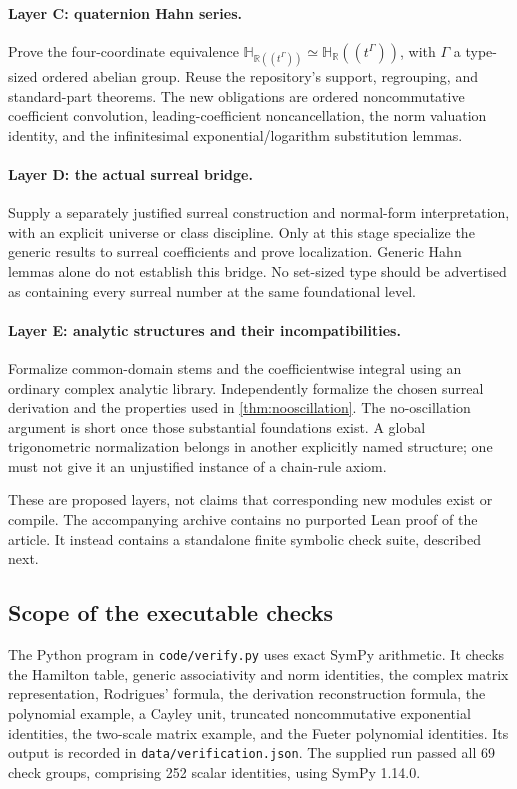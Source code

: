 \documentclass[11pt,letterpaper]{article}
\numberwithin{equation}{section}
\theoremstyle{definition}
\theoremstyle{remark}
\newcommand{\HR}{\mathbb H_{\mathbb R}}
\newcommand{\R}{\mathbb R}
\begin{document}
\paragraph{Layer C: quaternion Hahn series.}
Prove the four-coordinate equivalence
$\mathbb H_{\R((t^\Gamma))}\simeq\HR((t^\Gamma))$, with $\Gamma$ a type-sized ordered
abelian group. Reuse the repository's support, regrouping, and standard-part theorems.
The new obligations are ordered noncommutative coefficient convolution, leading-coefficient
noncancellation, the norm valuation identity, and the infinitesimal exponential/logarithm
substitution lemmas.

\paragraph{Layer D: the actual surreal bridge.}
Supply a separately justified surreal construction and normal-form interpretation, with an
explicit universe or class discipline. Only at this stage specialize the generic results to
surreal coefficients and prove localization. Generic Hahn lemmas alone do not establish this
bridge. No set-sized type should be advertised as containing every surreal number at the same
foundational level.

\paragraph{Layer E: analytic structures and their incompatibilities.}
Formalize common-domain stems and the coefficientwise integral using an ordinary complex
analytic library. Independently formalize the chosen surreal derivation and the properties
used in \cref{thm:nooscillation}. The no-oscillation argument is short once those substantial
foundations exist. A global trigonometric normalization belongs in another explicitly named
structure; one must not give it an unjustified instance of a chain-rule axiom.

These are proposed layers, not claims that corresponding new modules exist or compile.
The accompanying archive contains no purported Lean proof of the article. It instead
contains a standalone finite symbolic check suite, described next.

\subsection{Scope of the executable checks}
The Python program in \texttt{code/verify.py} uses exact SymPy arithmetic. It checks the
Hamilton table, generic associativity and norm identities, the complex matrix representation,
Rodrigues' formula, the derivation reconstruction formula, the polynomial example, a Cayley
unit, truncated noncommutative exponential identities, the two-scale matrix example, and the
Fueter polynomial identities. Its output is recorded in \texttt{data/verification.json}. The supplied run passed all
69 check groups, comprising 252 scalar identities, using SymPy 1.14.0.
\end{document}
